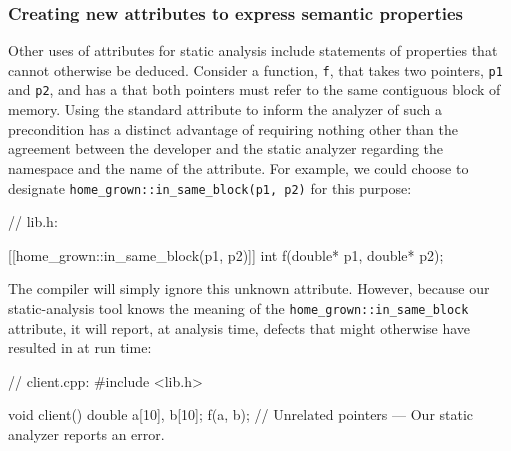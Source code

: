 \subsubsection[Creating new attributes to express semantic properties]{Creating new attributes to express semantic properties}\label{creating-new-attributes-to-express-semantic-properties}

Other uses of attributes for static analysis include statements of
properties that cannot otherwise be deduced. Consider a function, \lstinline!f!, that takes two pointers,
\lstinline!p1! and \lstinline!p2!, and has a  that both
pointers must refer to the same contiguous block of memory. Using the standard attribute to inform the analyzer of such a precondition has a distinct advantage of requiring nothing other than the agreement between the developer and the static analyzer regarding the namespace and the name of the attribute. For example, we could choose to designate \lstinline!home_grown::in_same_block(p1, p2)! for this purpose:

\begin{emcppslisting}[emcppsbatch=e11]
// lib.h:

[[home_grown::in_same_block(p1, p2)]]
int f(double* p1, double* p2);
\end{emcppslisting}

\noindent The compiler will simply ignore this unknown attribute. However, because our static-analysis tool knows the meaning of the \lstinline!home_grown::in_same_block! attribute, it will report, at analysis time, defects that might otherwise have resulted in  at run time:

\begin{emcppslisting}[emcppsbatch=e11]
// client.cpp:
#include <lib.h>

void client()
{
    double a[10], b[10];
    f(a, b);  // Unrelated pointers --- Our static analyzer reports an error.
}
\end{emcppslisting}


